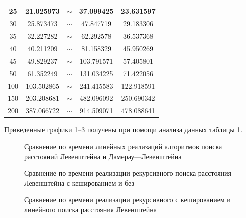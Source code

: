 \begin{table}[!ht]
\begin{tabular}{|c|c|c|c|c|}
		25 & 21.025973 & $\sim$ & 37.099425 & 23.631597 \\ \hline
		30 & 25.873473 & $\sim$ & 47.847719 & 29.183306 \\ \hline
		35 & 32.227282 & $\sim$ & 62.292578 & 36.537368 \\ \hline
		40 & 40.211209 & $\sim$ & 81.158329 & 45.950269 \\ \hline
		45 & 49.829237 & $\sim$ & 103.791571 & 57.405801 \\ \hline
		50 & 61.352249 & $\sim$ & 131.034225 & 71.422056 \\ \hline
		100 & 103.502865 & $\sim$ & 241.415583 & 122.918591 \\ \hline
		150 & 203.208681 & $\sim$ & 482.096092 & 250.690342 \\ \hline
		200 & 387.066722 & $\sim$ & 914.509071 & 478.088641 \\ \hline	
	\end{tabular}
	\label{t:timings}
\end{table}
\clearpage
Приведенные  графики \ref{plt:time_matrix_cmp}--\ref{plt:time_mat_rec_cmp}  получены при помощи анализа данных таблицы \ref{t:timings}.
\begin{figure}[H]
	\centering
	
	\caption{Сравнение по времени линейных реализаций алгоритмов поиска расстояний Левенштейна и Дамерау---Левенштейна}
	\label{plt:time_matrix_cmp}
\end{figure}

\begin{figure}[H]
	\centering
	
	\caption{Сравнение по времени реализации рекурсивного поиска расстояния Левенштейна с кешированием и без}
	\label{plt:time_rec_cmp}
\end{figure}

\begin{figure}[H]
	\centering
	
	\caption{Сравнение по времени реализации рекурсивного с кешированием и линейного поиска расстояния Левенштейна}
	\label{plt:time_mat_rec_cmp}
\end{figure}

